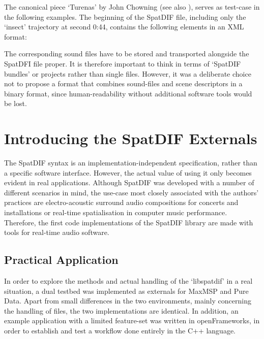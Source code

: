 \documentclass{article}
\begin{document}
The canonical piece `Turenas' by John Chowning (see also \cite{Peters:2013SpatDifCMJ}), serves as test-case in the following examples. 
The beginning of the SpatDIF file, including only the `insect' trajectory at second 0:44, contains the following elements in an XML format:

 

The corresponding sound files have to be stored and transported alongside the SpatDFI file proper. 
It is therefore important to think in terms of ‘SpatDIF bundles’ or projects rather than single files. 
However, it was a deliberate choice not to propose a format that combines sound-files and scene descriptors in a binary format, since human-readability without additional software tools would be lost.

\section{Introducing the SpatDIF Externals}\label{sec:Intro}

The SpatDIF syntax is an implementation-independent specification, rather than a specific software interface. 
However, the actual value of using it only becomes evident in real applications. 
Although SpatDIF was developed with a number of different scenarios in mind, the use-case most closely associated with the authors' practices are electro-acoustic surround audio compositions for concerts and installations or real-time spatialisation in computer music performance.
Therefore, the first code implementations of the SpatDIF library are made with tools for real-time audio software.

\subsection{Practical Application}\label{practical_usage}

In order to explore the methods and actual handling of the `libspatdif' in a real situation, a dual testbed was implemented as externals for MaxMSP and Pure Data.
Apart from small differences in the two environments, mainly concerning the handling of files, the two implementations are identical.
In addition, an example application with a limited feature-set was written in openFrameworks, in order to establish and test a workflow done entirely in the C++ language.
\end{document}

